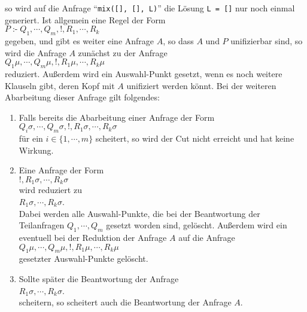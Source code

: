 so wird auf die Anfrage  ``\texttt{mix([], [], L)}'' die L\"{o}sung \texttt{L = []} nur noch
einmal generiert.  Ist allgemein eine Regel der Form \\[0.1cm]
\hspace*{1.3cm} $P \;\texttt{:-}\; Q_1, \cdots, Q_m, \texttt{!}, R_1, \cdots, R_k$ \\[0.1cm]
gegeben, und gibt es weiter eine Anfrage $A$, so dass $A$ und $P$  unifizierbar sind, so
wird die Anfrage $A$ zun\"{a}chst zu der Anfrage \\[0.1cm]
\hspace*{1.3cm} $Q_1\mu, \cdots, Q_m\mu, \texttt{!}, R_1\mu, \cdots, R_k\mu$ \\[0.1cm]
reduziert.  Außerdem wird ein Auswahl-Punkt gesetzt, wenn es noch weitere Klauseln gibt,
deren Kopf mit $A$ unifiziert werden k\"{o}nnt.
Bei der weiteren Abarbeitung dieser Anfrage gilt folgendes:
\begin{enumerate}
\item Falls bereits die Abarbeitung einer Anfrage der Form \\[0.1cm]
      \hspace*{1.3cm} 
      $Q_i\sigma, \cdots, Q_m\sigma, \texttt{!}, R_1\sigma, \cdots, R_k\sigma$ \\[0.1cm]
      f\"{u}r ein $i\in\{1,\cdots,m\}$ scheitert, so wird der Cut nicht erreicht und hat keine
      Wirkung.
\item Eine Anfrage der Form \\[0.1cm]
      \hspace*{1.3cm} 
      $\texttt{!}, R_1\sigma, \cdots, R_k\sigma$ \\[0.1cm]
      wird reduziert zu \\[0.1cm]
      \hspace*{1.3cm} 
      $R_1\sigma, \cdots, R_k\sigma$. \\[0.1cm]
      Dabei werden alle Auswahl-Punkte, die bei der Beantwortung der Teilanfragen
      $Q_1, \cdots, Q_m$ gesetzt worden sind, gel\"{o}scht.  Außerdem wird ein eventuell bei
      der Reduktion der Anfrage $A$ auf die Anfrage \\[0.1cm]
      \hspace*{1.3cm} $Q_1\mu, \cdots, Q_m\mu, \texttt{!}, R_1\mu, \cdots, R_k\mu$
      \\[0.1cm]
      gesetzter Auswahl-Punkte gel\"{o}scht.
\item Sollte sp\"{a}ter die Beantwortung der Anfrage \\[0.1cm]
      \hspace*{1.3cm} $R_1\sigma, \cdots, R_k\sigma$. \\[0.1cm]
      scheitern, so scheitert auch die Beantwortung der Anfrage $A$.
\end{enumerate}
